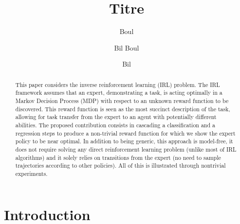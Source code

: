 \documentclass{llncs}
\newcommand{\0}{\mathbf{0}}
\newcommand{\1}{\mathbf{1}}
\begin{document}
\title{Titre}
\author{Boul \and Bil
Boul \and Bil}
\authorrunning{} %
%
\maketitle              %
\begin{abstract}
This paper considers the inverse reinforcement learning (IRL) problem. The IRL framework assumes that an expert, demonstrating a task, is acting optimally in a Markov Decision Process (MDP) with respect to an unknown reward function to be discovered. This reward function is seen as the most succinct description of the task, allowing for task transfer from the expert to an agent with potentially different abilities. The proposed contribution consists in cascading a classification and a regression steps to produce a non-trivial reward function for which we show the expert policy to be near optimal. In addition to being generic, this approach is model-free, it does not require solving any direct reinforcement learning problem (unlike most of IRL algorithms) and it solely relies on transitions from the expert (no need to sample trajectories according to other policies). All of this is illustrated through nontrivial experiments.
\end{abstract}

\section{Introduction}
\end{document}
